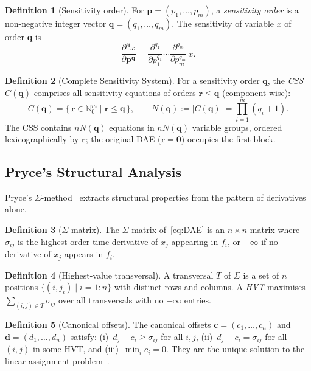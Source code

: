 \documentclass[12pt,a4paper]{article}
\theoremstyle{definition}
\newtheorem{definition}{Definition}[section]
\theoremstyle{plain}
\theoremstyle{remark}
\newcommand{\vp}{\mathbf{p}}
\newcommand{\vq}{\mathbf{q}}
\newcommand{\vr}{\mathbf{r}}
\newcommand{\vc}{\mathbf{c}}
\newcommand{\vd}{\mathbf{d}}
\newcommand{\vzero}{\mathbf{0}}
\begin{document}
\begin{definition}[Sensitivity order]
For $\vp = (p_1,\dots,p_m)$, a \emph{sensitivity order} is a non-negative integer vector $\vq = (q_1,\dots,q_m)$. The sensitivity of variable $x$ of order $\vq$ is
\[
  \frac{\partial^{\vq} x}{\partial \vp^{\vq}}
  = \frac{\partial^{q_1}}{\partial p_1^{q_1}} \cdots
    \frac{\partial^{q_m}}{\partial p_m^{q_m}}\,x.
\]
\end{definition}

\begin{definition}[Complete Sensitivity System]
For a sensitivity order $\vq$, the \emph{CSS} $C(\vq)$ comprises all sensitivity equations of orders $\vr \le \vq$ (component-wise):
\[
  C(\vq) = \{\,\vr\in\mathbb{N}_0^m \mid \vr\le\vq\,\},\qquad
  N(\vq) := |C(\vq)| = \prod_{i=1}^m (q_i+1).
\]
The CSS contains $n N(\vq)$ equations in $n N(\vq)$ variable groups, ordered lexicographically by $\vr$; the original DAE ($\vr=\vzero$) occupies the first block.
\end{definition}

\subsection{Pryce's Structural Analysis}

Pryce's $\Sigma$-method~\cite{pryce2001simple} extracts structural properties from the pattern of derivatives alone.

\begin{definition}[$\Sigma$-matrix]
The $\Sigma$-matrix of~\eqref{eq:DAE} is an $n\times n$ matrix where $\sigma_{ij}$ is the highest-order time derivative of $x_j$ appearing in $f_i$, or $-\infty$ if no derivative of $x_j$ appears in $f_i$.
\end{definition}

\begin{definition}[Highest-value transversal]
A transversal $T$ of $\Sigma$ is a set of $n$ positions $\{(i,j_i)\mid i=1:n\}$ with distinct rows and columns. A \emph{HVT} maximises $\sum_{(i,j)\in T}\sigma_{ij}$ over all transversals with no $-\infty$ entries.
\end{definition}

\begin{definition}[Canonical offsets]
The canonical offsets $\vc = (c_1,\dots,c_n)$ and $\vd = (d_1,\dots,d_n)$ satisfy: (i)~$d_j - c_i \ge \sigma_{ij}$ for all $i,j$, (ii)~$d_j - c_i = \sigma_{ij}$ for all $(i,j)$ in some HVT, and (iii)~$\min_i c_i = 0$. They are the unique solution to the linear assignment problem~\cite{pryce2001simple}.
\end{definition}
\end{document}
